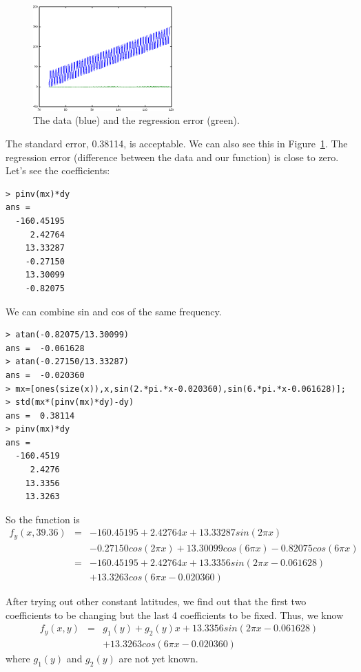 \documentclass[a4paper]{article}
\begin{document}
\begin{figure}[htb]
\begin{center}
\includegraphics[width=0.48\textwidth]{fyx-lc.png}
\end{center}
\caption{The data (blue) and the regression error (green).}
\label{fig:fyx-lc}
\end{figure}
The standard error, 0.38114, is acceptable.
We can also see this in Figure~\ref{fig:fyx-lc}.
The regression error (difference between the data and our function) is close
to zero.
Let's see the coefficients:

\begin{verbatim}
> pinv(mx)*dy
ans =
  -160.45195
     2.42764
    13.33287
    -0.27150
    13.30099
    -0.82075
\end{verbatim}

We can combine sin and cos of the same frequency.

\begin{verbatim}
> atan(-0.82075/13.30099)
ans =  -0.061628
> atan(-0.27150/13.33287)
ans =  -0.020360
> mx=[ones(size(x)),x,sin(2.*pi.*x-0.020360),sin(6.*pi.*x-0.061628)];
> std(mx*(pinv(mx)*dy)-dy)
ans =  0.38114
> pinv(mx)*dy
ans =
  -160.4519
     2.4276
    13.3356
    13.3263
\end{verbatim}
So the function is
\begin{eqnarray}
f_y(x,39.36) & = & -160.45195+2.42764x+13.33287sin(2\pi x) \nonumber \\
             &   & -0.27150cos(2\pi x)+13.30099cos(6\pi x)-0.82075cos(6\pi x) \nonumber \\
             & = & -160.45195+2.42764x+13.3356sin(2\pi x-0.061628) \nonumber \\
             &   & +13.3263cos(6\pi x-0.020360)
\end{eqnarray}

After trying out other constant latitudes, we find out that the first two
coefficients to be changing but the last 4 coefficients to be fixed.
Thus, we know
\begin{eqnarray}
\label{eq:fyx}
f_y(x,y) & = & g_1(y)+g_2(y)x+13.3356sin(2\pi x-0.061628) \nonumber \\
         &   & +13.3263cos(6\pi x-0.020360)
\end{eqnarray}
where $g_1(y)$ and $g_2(y)$ are not yet known.
\end{document}
